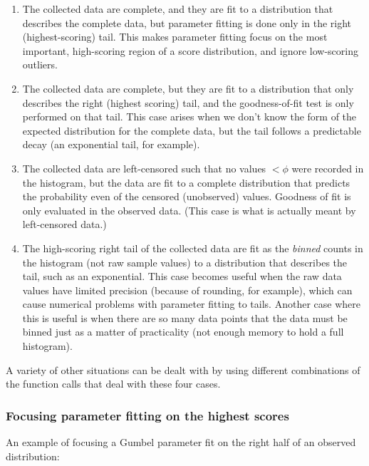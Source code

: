 \begin{enumerate}
\item The collected data are complete, and they are fit to a
      distribution that describes the complete data, but parameter
      fitting is done only in the right (highest-scoring) tail. This
      makes parameter fitting focus on the most important,
      high-scoring region of a score distribution, and ignore
      low-scoring outliers.

\item The collected data are complete, but they are fit to a
      distribution that only describes the right (highest scoring)
      tail, and the goodness-of-fit test is only performed on that
      tail. This case arises when we don't know the form of the
      expected distribution for the complete data, but the tail
      follows a predictable decay (an exponential tail, for example).

\item The collected data are left-censored such that no values $<
      \phi$ were recorded in the histogram, but the data are fit to a
      complete distribution that predicts the probability even of the
      censored (unobserved) values. Goodness of fit is only evaluated
      in the observed data. (This case is what is actually meant by
      left-censored data.)

\item The high-scoring right tail of the collected data are fit as the
      \emph{binned} counts in the histogram (not raw sample values) to
      a distribution that describes the tail, such as an
      exponential. This case becomes useful when the raw data values
      have limited precision (because of rounding, for example), which
      can cause numerical problems with parameter fitting to tails.
      Another case where this is useful is when there are so many data
      points that the data must be binned just as a matter of
      practicality (not enough memory to hold a full histogram).
\end{enumerate}

A variety of other situations can be dealt with by using different
combinations of the function calls that deal with these four cases.


\subsubsection{Focusing parameter fitting on the highest scores}

An example of focusing a Gumbel parameter fit on the right half of an
observed distribution:

